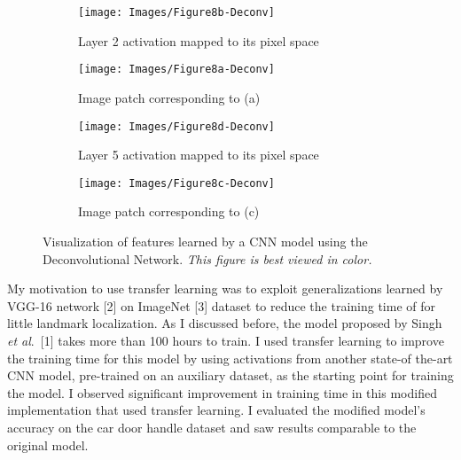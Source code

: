 \documentclass [11pt,letterpaper ,twoside ,openany ]{report}
\begin{document}
    \begin{figure}[t]
    \centering
        \begin{subfigure}[b]{0.23\linewidth}
            \centering
            \texttt{[image: Images/Figure8b-Deconv]}
            \caption{Layer 2 activation mapped to its pixel space}
        \end{subfigure}    
        \begin{subfigure}[b]{0.23\linewidth}
            \centering
            \texttt{[image: Images/Figure8a-Deconv]}
            \caption{Image patch corresponding to (a)}
        \end{subfigure}
        \begin{subfigure}[b]{0.23\linewidth}
            \centering
            \texttt{[image: Images/Figure8d-Deconv]}
            \caption{Layer 5 activation mapped to its pixel space}
        \end{subfigure}                
        \begin{subfigure}[b]{0.23\linewidth}
            \centering
            \texttt{[image: Images/Figure8c-Deconv]}
            \caption{Image patch corresponding to (c)}
        \end{subfigure}
        \caption{Visualization of features learned by a CNN model using the Deconvolutional Network. \textit{This figure is best viewed in color.}}
        \label{fig:devonv}
    \end{figure}

    My motivation to use transfer learning was to exploit generalizations learned by VGG-16 network [2] on ImageNet [3] dataset to reduce the training time of for little landmark localization. As I discussed before, the model proposed by Singh \textit{et al}.\ [1] takes more than 100 hours to train. I used transfer learning to improve the training time for this model by using activations from another state-of the-art CNN model, pre-trained on an auxiliary dataset, as the starting point for training the model. I observed significant improvement in training time in this modified implementation that used transfer learning. I evaluated the modified model's accuracy on the car door handle dataset and saw results comparable to the original model.
\end{document}
